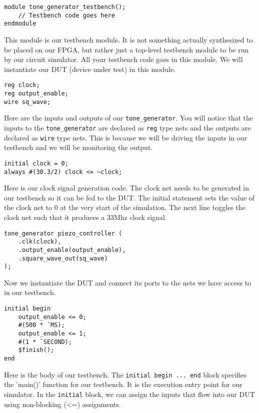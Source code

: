 \documentclass[11pt]{article}
\begin{document}
\begin{verbatim}
module tone_generator_testbench();
	// Testbench code goes here
endmodule
\end{verbatim}

This module is our testbench module. It is not something actually synthesized to be placed on our FPGA, but rather just a top-level testbench module to be run by our circuit simulator. All your testbench code goes in this module. We will instantiate our DUT (device under test) in this module.

\begin{verbatim}
reg clock;
reg output_enable;
wire sq_wave;
\end{verbatim}

Here are the inputs and outputs of our \verb|tone_generator|. You will notice that the inputs to the \verb|tone_generator| are declared as \verb|reg| type nets and the outputs are declared as \verb|wire| type nets. This is because we will be driving the inputs in our testbench and we will be monitoring the output.

\begin{verbatim}
initial clock = 0;
always #(30.3/2) clock <= ~clock;
\end{verbatim}

Here is our clock signal generation code. The clock net needs to be generated in our testbench so it can be fed to the DUT. The initial statement sets the value of the clock net to 0 at the very start of the simulation. The next line toggles the clock net such that it produces a 33Mhz clock signal.

\begin{verbatim}
tone_generator piezo_controller (
    .clk(clock),
    .output_enable(output_enable),
    .square_wave_out(sq_wave)
);
\end{verbatim}

Now we instantiate the DUT and connect its ports to the nets we have access to in our testbench.

\begin{verbatim}
initial begin
    output_enable <= 0;
    #(500 * `MS);
    output_enable <= 1;
    #(1 * `SECOND);
    $finish();
end
\end{verbatim}

Here is the body of our testbench. The \verb|initial begin ... end| block specifies the 'main()' function for our testbench. It is the execution entry point for our simulator. In the \verb|initial| block, we can assign the inputs that flow into our DUT using non-blocking (<=) assignments. \\
\end{document}
